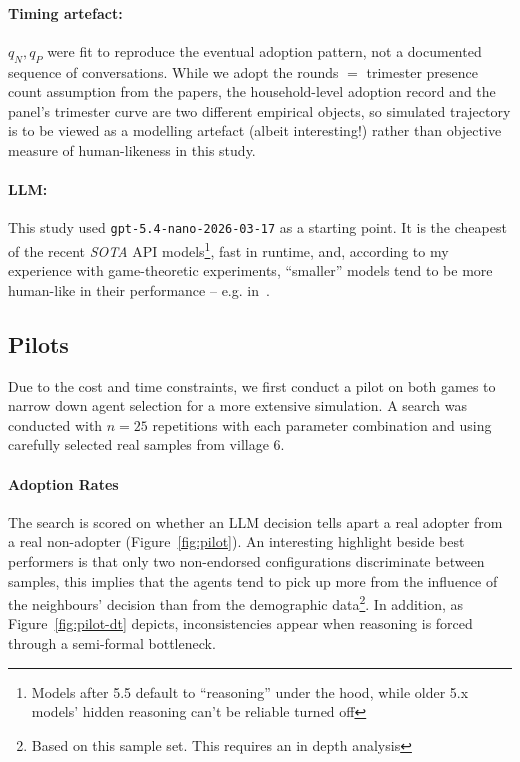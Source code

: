 \documentclass[11pt]{article}
\begin{document}
\paragraph{Timing artefact:} $q_N,q_P$ were fit to reproduce the eventual adoption pattern, not a documented sequence of conversations.
While we adopt the rounds $=$ trimester presence count assumption from the papers, the household-level adoption record and the panel's trimester curve are two different empirical objects, so simulated trajectory is to be viewed as a modelling artefact (albeit interesting!) rather than objective measure of human-likeness in this study.

\paragraph{LLM:} This study used \texttt{gpt-5.4-nano-2026-03-17} as a starting point. It is the cheapest of the recent \textit{SOTA} API models\footnote{Models after 5.5 default to ``reasoning'' under the hood, while older 5.x models' hidden reasoning can't be reliable turned off}, fast in runtime, and, according to my experience with game-theoretic experiments, ``smaller'' models tend to be more human-like in their performance -- e.g. in~\citep{Trencsenyi2025}.

\subsection{Pilots}
Due to the cost and time constraints, we first conduct a pilot on both games to narrow down agent selection for a more extensive simulation. A search was conducted with $n=25$ repetitions with each parameter combination and using carefully selected real samples from village 6.

\paragraph{Adoption Rates}

The search is scored on whether an LLM decision tells apart a real adopter from a real non-adopter (Figure~\ref{fig:pilot}). An interesting highlight beside best performers is that only two non-endorsed configurations discriminate between samples, this implies that the agents tend to pick up more from the influence of the neighbours' decision than from the demographic data\footnote{Based on this sample set. This requires an in depth analysis}. In addition, as Figure~\ref{fig:pilot-dt} depicts, inconsistencies appear when reasoning is forced through a semi-formal bottleneck.
\end{document}
